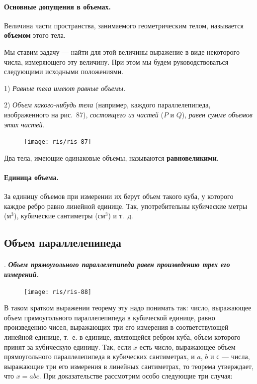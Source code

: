 \documentclass[twoside]{book}
\begin{document}
\paragraph{Основные допущения в объемах.}\label{1938/s82}
Величина части пространства, занимаемого геометрическим телом, называется \textbf{объемом} этого тела.

Мы ставим задачу --- найти для этой величины выражение в виде некоторого числа, измеряющего эту величину.
При этом мы будем руководствоваться следующими исходными положениями.

1) \emph{Равные тела имеют равные объемы.}

2) \emph{Объем какого-нибудь тела}
(например, каждого параллелепипеда, изображенного на рис.~87),
\emph{состоящего из частей}
($P$ и $Q$),
\emph{равен сумме объемов этих частей.}

\begin{figure}[h!]
\centering
\texttt{[image: ris/ris-87]}
\caption{}
\end{figure}

Два тела, имеющие одинаковые объемы, называются \textbf{равновеликими}.

\paragraph{Единица объема.}\label{1938/s83}
За единицу объемов при измерении их берут объем такого куба, у которого каждое ребро равно линейной единице.
Так, употребительны кубические метры (м$^3$), кубические сантиметры (см$^3$) и т.~д.



\subsection*{Объем параллелепипеда}

\paragraph{}\label{1938/s84}
.
\textbf{\emph{Объем прямоугольного параллелепипеда равен произведению трех его измерений.}}

\begin{figure}[h!]
\centering
\texttt{[image: ris/ris-88]}
\caption{}
\end{figure}

В таком кратком выражении теорему эту надо понимать так: число, выражающее объем прямоугольного параллелепипеда в кубической единице, равно произведению чисел, выражающих три его измерения в соответствующей линейной единице, т.~е. в единице, являющейся ребром куба, объем которого принят за кубическую единицу.
Так, если $x$ есть число, выражающее объем прямоугольного параллелепипеда в кубических сантиметрах, и $a$, $b$ и с --- числа, выражающие три его измерения в линейных сантиметрах, то теорема утверждает, что $x=abc$.
При доказательстве рассмотрим особо следующие три случая:
\end{document}
